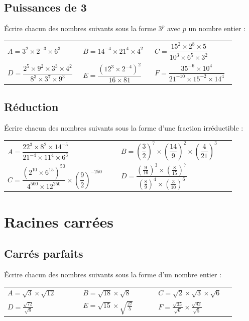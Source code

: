 \documentclass[oneside,12pt]{article}          %
\begin{document}
\subsection{Puissances de 3}
Écrire chacun des nombres suivants sous la forme $3^p$ avec $p$ un nombre entier :

\renewcommand{\arraystretch}{2.5}
\begin{tabular}{p{0.3\linewidth} p{0.3\linewidth} p{0.3\linewidth}}
    $A=3^2\times2^{-3}\times6^3$ & $B=14^{-4}\times21^4\times4^2$ & $C=\dfrac{15^2\times2^8\times5}{10^3\times6^5\times3^2}$ \\
    $D=\dfrac{2^5\times9^2\times3^3\times4^2}{8^3\times3^7\times9^3}$ & $E=\dfrac{\left(12^3\times2^{-4}\right)^2}{16\times81}$ & $F=\dfrac{35^{-6}\times10^4}{21^{-10}\times15^{-2}\times14^4}$
\end{tabular}



\subsection{Réduction}
Écrire chacun des nombres suivants sous la forme d'une fraction irréductible :

\renewcommand{\arraystretch}{3}
\begin{tabular}{p{0.45\linewidth} p{0.45\linewidth}}
    $A=\dfrac{22^3\times8^2\times14^{-5}}{21^{-4}\times11^4\times6^3}$ & $B=\left(\dfrac{3}{2}\right)^7\times\left(\dfrac{14}{9}\right)^2\times\left(\dfrac{4}{21}\right)^3$ \\
    $C=\dfrac{\left(2^{10}\times6^{15}\right)^{50}}{4^{500}\times12^{250}}\times\left(\dfrac{9}{2}\right)^{-250}$ & $D=\dfrac{\left(\frac{9}{16}\right)^3\times\left(\frac{8}{15}\right)^7}{\left(\frac{8}{9}\right)^4\times\left(\frac{3}{10}\right)^6}$
\end{tabular}



\section{Racines carrées}

\subsection{Carrés parfaits}
Écrire chacun des nombres suivants sous la forme d'un nombre entier :

\renewcommand{\arraystretch}{1.5}
\begin{tabular}{p{0.3\linewidth} p{0.3\linewidth} p{0.3\linewidth}}
    $A=\sqrt{3}\times\sqrt{12}$ & $B=\sqrt{18}\times \sqrt{8}$ & $C=\sqrt{2}\times\sqrt{3}\times\sqrt{6}$ \\
    $D=\frac{\sqrt{72}}{\sqrt{8}}$ & $E=\sqrt{15}\times\sqrt{\frac{27}{5}}$ & $F=\frac{\sqrt{35}}{\sqrt{6}}\times\frac{\sqrt{42}}{\sqrt{5}}$
\end{tabular}
\end{document}
